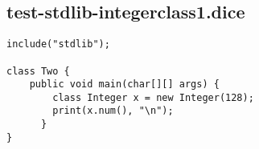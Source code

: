 \subsection{test-stdlib-integerclass1.dice}
\begin{verbatim}
include("stdlib");

class Two {
	public void main(char[][] args) {
        class Integer x = new Integer(128);
        print(x.num(), "\n");
      }
}

\end{verbatim}